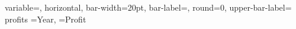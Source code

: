 \documentclass[12pt]{article}
\begin{document}
\DTLbarchart
{
 variable=\theProfit,
 horizontal,
 bar-width=20pt, 
 bar-label=\theYear,
 round=0,
 upper-bar-label=\DTLbarvalue
}
{profits}%
 {%
 \theYear=Year,
 \theProfit=Profit
} 
\end{document}
